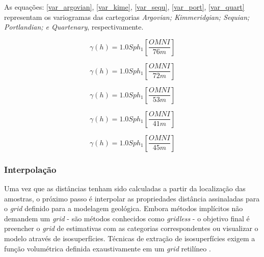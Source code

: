 \begin{figure}[H]
\end{figure}

As equações: \autoref{var_argovian}, \autoref{var_kime}, \autoref{var_sequ}, \autoref{var_port}, \autoref{var_quart} representam os variogramas das cartegorias \textit{Argovian; Kimmeridgian; Sequian;
Portlandian; e Quartenary}, respectivamente.

\begin{equation}
    \label{var_argovian}
    \gamma(h)=1.0Sph_{1} \left[ \frac{OMNI}{76 m} \right]
\end{equation}

\begin{equation}
    \label{var_kime}
    \gamma(h)=1.0Sph_{1} \left[ \frac{OMNI}{72 m} \right]
\end{equation}

\begin{equation}
    \label{var_sequ}
    \gamma(h)=1.0Sph_{1} \left[ \frac{OMNI}{53 m} \right]
\end{equation}

\begin{equation}
    \label{var_port}
    \gamma(h)=1.0Sph_{1} \left[ \frac{OMNI}{41 m} \right]
\end{equation}

\begin{equation}
    \label{var_quart}
    \gamma(h)=1.0Sph_{1} \left[ \frac{OMNI}{45 m} \right]
\end{equation}

\subsubsection{Interpolação}

Uma vez que as distâncias tenham sido calculadas a partir da localização das amostras, o próximo passo é interpolar as propriedades distância assinaladas para o \textit{grid} definido para a modelagem geológica. Embora métodos implícitos não demandem um \textit{grid} - são métodos conhecidos como \textit{gridless} - o objetivo final é preencher o \textit{grid} de estimativas com as categorias correspondentes ou visualizar o modelo através de isosuperfícies. Técnicas de extração de isosuperfícies exigem a função volumétrica definida exaustivamente em um \textit{grid} retilíneo  \cite{martin2017implicitmodeling}.

